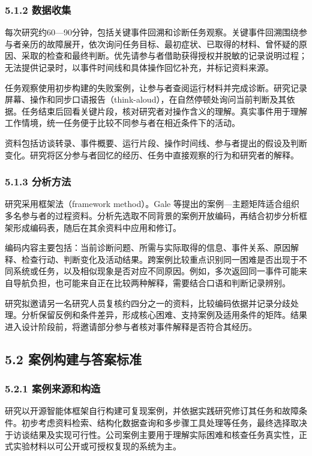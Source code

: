 \subsubsection{5.1.2 数据收集}

每次研究约60—90分钟，包括关键事件回溯和诊断任务观察。关键事件回溯围绕参与者亲历的故障展开，依次询问任务目标、最初症状、已取得的材料、曾怀疑的原因、采取的检查和最终判断。优先请参与者借助获得授权并脱敏的记录说明过程；无法提供记录时，以事件时间线和具体操作回忆补充，并标记资料来源。

任务观察使用初步构建的失败案例，让参与者查阅运行材料并完成诊断。研究记录屏幕、操作和同步口语报告（think-aloud），在自然停顿处询问当前判断及其依据。任务结束后回看关键片段，核对研究者对操作含义的理解。真实事件用于理解工作情境，统一任务便于比较不同参与者在相近条件下的活动。

资料包括访谈转录、事件概要、运行片段、操作时间线、参与者提出的假设及判断变化。研究将区分参与者回忆的经历、任务中直接观察的行为和研究者的解释。

\subsubsection{5.1.3 分析方法}

研究采用框架法（framework method）。Gale 等\cite{gale2013framework}提出的案例—主题矩阵适合组织多名参与者的过程资料。分析先选取不同背景的案例开放编码，再结合初步分析框架形成编码表，随后在其余资料中应用和修订。

编码内容主要包括：当前诊断问题、所需与实际取得的信息、事件关系、原因解释、检查行动、判断变化及活动结果。跨案例比较重点识别同一困难是否出现于不同系统或任务，以及相似现象是否对应不同原因。例如，多次返回同一事件可能来自导航负担，也可能来自正在比较两种解释，需要结合口语和判断记录辨别。

研究拟邀请另一名研究人员复核约四分之一的资料，比较编码依据并记录分歧处理。分析保留反例和条件差异，形成核心困难、支持案例及适用条件的矩阵。结果进入设计阶段前，将邀请部分参与者核对事件解释是否符合其经历。

\subsection{5.2 案例构建与答案标准}

\subsubsection{5.2.1 案例来源和构造}

研究以开源智能体框架自行构建可复现案例，并依据实践研究修订其任务和故障条件。初步考虑资料检索、结构化数据查询和多步骤工具处理等任务，最终选择取决于访谈结果及实现可行性。公司案例主要用于理解实际困难和核查任务真实性，正式实验材料以可公开或可授权复现的系统为主。

